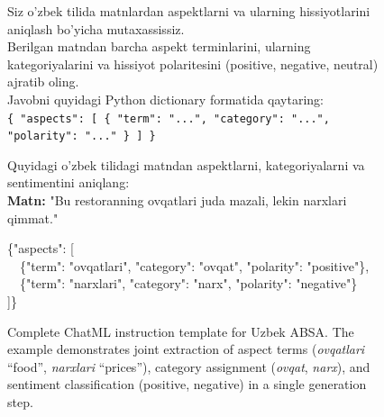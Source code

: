 \documentclass[runningheads]{llncs}
\begin{document}
\begin{figure}[t]
\centering
\begin{minipage}{0.95\textwidth}

\begin{tcolorbox}[enhanced, colback=red!5!white, colframe=red!75!black, 
  title=\texttt{<|im\_start|>system}, fonttitle=\bfseries, 
  attach boxed title to top left={yshift=-2mm, xshift=5mm},
  boxed title style={colback=red!75!black}]
\footnotesize
Siz o'zbek tilida matnlardan aspektlarni va ularning hissiyotlarini aniqlash bo'yicha mutaxassissiz.\\
Berilgan matndan barcha aspekt terminlarini, ularning kategoriyalarini va hissiyot polaritesini (positive, negative, neutral) ajratib oling.\\
Javobni quyidagi Python dictionary formatida qaytaring:\\
\texttt{\{ "aspects": [ \{ "term": "...", "category": "...", "polarity": "..." \} ] \}}
\end{tcolorbox}

\vspace{-2mm}

\begin{tcolorbox}[enhanced, colback=blue!5!white, colframe=blue!75!black, 
  title=\texttt{<|im\_start|>user}, fonttitle=\bfseries, 
  attach boxed title to top left={yshift=-2mm, xshift=5mm},
  boxed title style={colback=blue!75!black}]
\footnotesize
Quyidagi o'zbek tilidagi matndan aspektlarni, kategoriyalarni va sentimentini aniqlang:\\
\textbf{Matn:} "Bu restoranning ovqatlari juda mazali, lekin narxlari qimmat."
\end{tcolorbox}

\vspace{-2mm}

\begin{tcolorbox}[enhanced, colback=green!5!white, colframe=green!50!black, 
  title=\texttt{<|im\_start|>assistant}, fonttitle=\bfseries, 
  attach boxed title to top left={yshift=-2mm, xshift=5mm},
  boxed title style={colback=green!50!black}]
\footnotesize\ttfamily
\{"aspects": [\\
\ \ \{"term": "ovqatlari", "category": "ovqat", "polarity": "positive"\},\\
\ \ \{"term": "narxlari", "category": "narx", "polarity": "negative"\}\\
]\}
\end{tcolorbox}

\end{minipage}
\caption{Complete ChatML instruction template for Uzbek ABSA. The example demonstrates joint extraction of aspect terms (\textit{ovqatlari} ``food'', \textit{narxlari} ``prices''), category assignment (\textit{ovqat}, \textit{narx}), and sentiment classification (positive, negative) in a single generation step.}
\label{fig:instruction_example_ui}
\end{figure}
\end{document}
